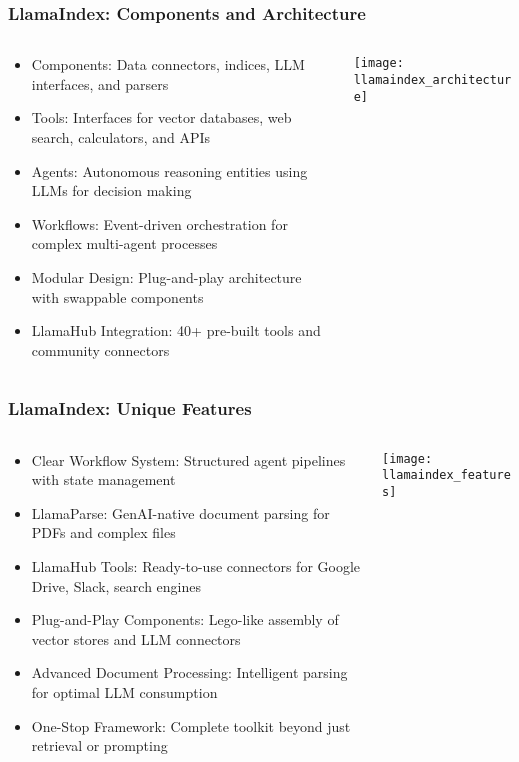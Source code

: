 \begin{frame}[fragile]\frametitle{LlamaIndex: Components and Architecture}
\begin{columns}
    \begin{column}[T]{0.6\linewidth}
      \begin{itemize}
		\item Components: Data connectors, indices, LLM interfaces, and parsers
		\item Tools: Interfaces for vector databases, web search, calculators, and APIs
		\item Agents: Autonomous reasoning entities using LLMs for decision making
		\item Workflows: Event-driven orchestration for complex multi-agent processes
		\item Modular Design: Plug-and-play architecture with swappable components
		\item LlamaHub Integration: 40+ pre-built tools and community connectors
	  \end{itemize}
    \end{column}
    \begin{column}[T]{0.4\linewidth}
		\begin{center}
		\texttt{[image: llamaindex\_architecture]}
		\end{center}	
    \end{column}
  \end{columns}
\end{frame}

\begin{frame}[fragile]\frametitle{LlamaIndex: Unique Features}
\begin{columns}
    \begin{column}[T]{0.6\linewidth}
      \begin{itemize}
		\item Clear Workflow System: Structured agent pipelines with state management
		\item LlamaParse: GenAI-native document parsing for PDFs and complex files
		\item LlamaHub Tools: Ready-to-use connectors for Google Drive, Slack, search engines
		\item Plug-and-Play Components: Lego-like assembly of vector stores and LLM connectors
		\item Advanced Document Processing: Intelligent parsing for optimal LLM consumption
		\item One-Stop Framework: Complete toolkit beyond just retrieval or prompting
	  \end{itemize}
    \end{column}
    \begin{column}[T]{0.4\linewidth}
		\begin{center}
		\texttt{[image: llamaindex\_features]}
		\end{center}	
    \end{column}
  \end{columns}
\end{frame}

